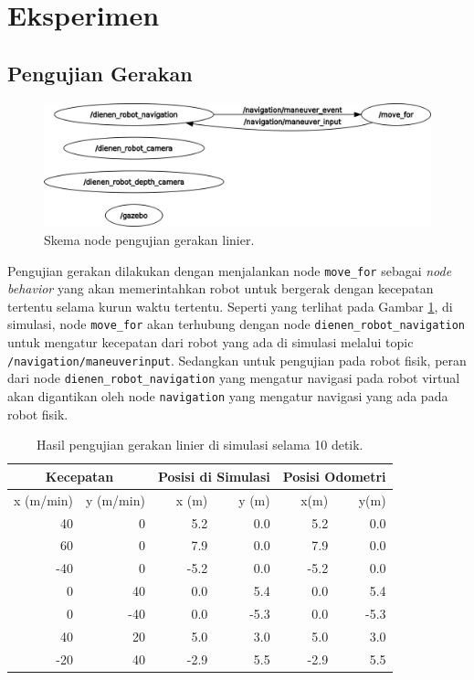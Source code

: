 \section{Eksperimen}
\label{sec:eksperimen}

\subsection{Pengujian Gerakan}

\begin{figure} [ht]
  \centering
  \includegraphics[scale=0.25]{gambar/nodeujigerak.png}
  \caption{Skema node pengujian gerakan linier.}
  \label{fig:nodeujigerak}
\end{figure}

Pengujian gerakan dilakukan dengan menjalankan node \lstinline{move_for} sebagai \emph{node behavior} yang akan memerintahkan robot untuk bergerak dengan kecepatan tertentu selama kurun waktu tertentu.
Seperti yang terlihat pada Gambar \ref{fig:nodeujigerak}, di simulasi, node \lstinline{move_for} akan terhubung dengan node \lstinline{dienen_robot_navigation} untuk mengatur kecepatan dari robot yang ada di simulasi melalui topic \lstinline{/navigation/maneuverinput}.
Sedangkan untuk pengujian pada robot fisik, peran dari node \lstinline{dienen_robot_navigation} yang mengatur navigasi pada robot virtual akan digantikan oleh node \lstinline{navigation} yang mengatur navigasi yang ada pada robot fisik.

\begin{table}
  \caption{Hasil pengujian gerakan linier di simulasi selama 10 detik.}
  \label{tab:hasilujiliniersimulasi}
  \centering
  \begin{tabular}{rr|rr|rr}
    \toprule
    \multicolumn{2}{c|}{Kecepatan} &
    \multicolumn{2}{|c|}{Posisi di Simulasi} &
    \multicolumn{2}{|c}{Posisi Odometri} \\
    \midrule
    x (m/min) & y (m/min) & x (m) & y (m) & x(m)  & y(m) \\
    \midrule
    40        & 0         & 5.2   & 0.0   & 5.2   & 0.0 \\
    60        & 0         & 7.9   & 0.0   & 7.9   & 0.0 \\
    -40       & 0         & -5.2  & 0.0   & -5.2  & 0.0 \\
    0         & 40        & 0.0   & 5.4   & 0.0   & 5.4 \\
    0         & -40       & 0.0   & -5.3  & 0.0   & -5.3 \\
    40        & 20        & 5.0   & 3.0   & 5.0   & 3.0 \\
    -20       & 40        & -2.9  & 5.5   & -2.9  & 5.5 \\
    \bottomrule
  \end{tabular}
\end{table}

